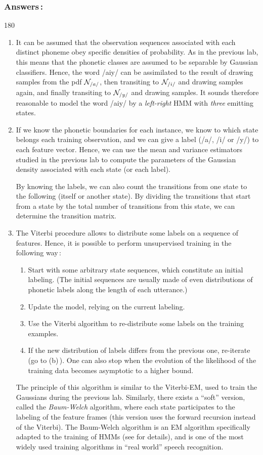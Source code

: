 \documentclass[twoside,a4paper,titlepage]{article}
\newcommand{\expl}[1]{%
\begin{turn}{180}%
\parbox{\textwidth}{\em #1}%
\end{turn}%
}
\newcommand{\tab}{\hspace{1em}}
\begin{document}
\subsubsection*{Answers\,:}
\expl{
\begin{enumerate}
\item It can be assumed that the observation sequences associated with each
distinct phoneme obey specific densities of probability. As in the previous
lab, this means that the phonetic classes are assumed to be separable by
Gaussian classifiers. Hence, the word /aiy/ can be assimilated to the
result of drawing samples from the pdf ${\cal N}_{/a/}$, then transiting to
${\cal N}_{/i/}$ and drawing samples again, and finally transiting to
${\cal N}_{/y/}$ and drawing samples. It sounds therefore reasonable to
model the word /aiy/ by a {\em left-right} HMM with {\em three} emitting
states.
%
\item If we know the phonetic boundaries for each instance, we know to
which state belongs each training observation, and we can give a label
(/a/, /i/ or /y/) to each feature vector. Hence, we can use the mean and
variance estimators studied in the previous lab to compute the parameters
of the Gaussian density associated with each state (or each label).

\tab By knowing the labels, we can also count the transitions from one
state to the following (itself or another state). By dividing the
transitions that start from a state by the total number of transitions from
this state, we can determine the transition matrix.
%
\item The Viterbi procedure allows to distribute some labels on a sequence
of features. Hence, it is possible to perform unsupervised training in the
following way\,:
%
\begin{enumerate}
\item Start with some arbitrary state sequences, which constitute an
initial labeling. (The initial sequences are usually made of even
distributions of phonetic labels along the length of each utterance.)
\item Update the model, relying on the current labeling.
\item Use the Viterbi algorithm to re-distribute some labels on the
training examples.
\item If the new distribution of labels differs from the previous one,
re-iterate (go to (b)\,). One can also stop when the evolution of the
likelihood of the training data becomes asymptotic to a higher bound.
\end{enumerate}
%
The principle of this algorithm is similar to the Viterbi-EM, used to train
the Gaussians during the previous lab. Similarly, there exists a ``soft''
version, called the {\em Baum-Welch} algorithm, where each state
participates to the labeling of the feature frames (this version uses the
forward recursion instead of the Viterbi). The Baum-Welch algorithm is an
EM algorithm specifically adapted to the training of HMMs (see \cite{RAB93}
for details), and is one of the most widely used training algorithms in
``real world'' speech recognition.
\end{enumerate}
}
\end{document}
